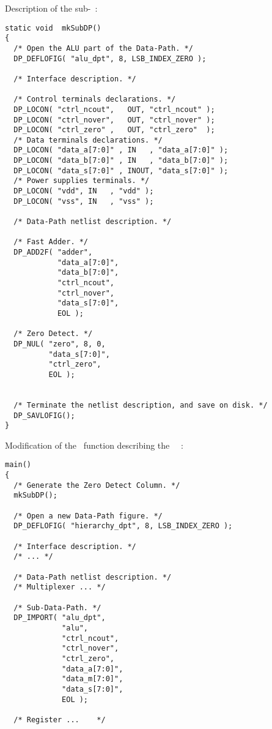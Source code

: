      \begin{description}
       \samepage
       \item
         Description of the sub-\datapath~:
         { \tt \begin{verbatim}
static void  mkSubDP()
{
  /* Open the ALU part of the Data-Path. */
  DP_DEFLOFIG( "alu_dpt", 8, LSB_INDEX_ZERO );

  /* Interface description. */

  /* Control terminals declarations. */
  DP_LOCON( "ctrl_ncout",   OUT, "ctrl_ncout" );
  DP_LOCON( "ctrl_nover",   OUT, "ctrl_nover" );
  DP_LOCON( "ctrl_zero" ,   OUT, "ctrl_zero"  );
  /* Data terminals declarations. */
  DP_LOCON( "data_a[7:0]" , IN   , "data_a[7:0]" );
  DP_LOCON( "data_b[7:0]" , IN   , "data_b[7:0]" );
  DP_LOCON( "data_s[7:0]" , INOUT, "data_s[7:0]" );
  /* Power supplies terminals. */
  DP_LOCON( "vdd", IN   , "vdd" );
  DP_LOCON( "vss", IN   , "vss" );

  /* Data-Path netlist description. */

  /* Fast Adder. */
  DP_ADD2F( "adder",
            "data_a[7:0]",
            "data_b[7:0]",
            "ctrl_ncout",
            "ctrl_nover",
            "data_s[7:0]",
            EOL );

  /* Zero Detect. */
  DP_NUL( "zero", 8, 0,
          "data_s[7:0]",
          "ctrl_zero",
          EOL );


  /* Terminate the netlist description, and save on disk. */
  DP_SAVLOFIG();
}
         \end{verbatim} \rm }
         \pagebreak[1]
       \item
         Modification of the \C\ function describing the \datapath\ \netlist~:
         { \tt \begin{verbatim}
main()
{
  /* Generate the Zero Detect Column. */
  mkSubDP();

  /* Open a new Data-Path figure. */
  DP_DEFLOFIG( "hierarchy_dpt", 8, LSB_INDEX_ZERO );

  /* Interface description. */
  /* ... */

  /* Data-Path netlist description. */ 
  /* Multiplexer ... */

  /* Sub-Data-Path. */
  DP_IMPORT( "alu_dpt",
             "alu",
             "ctrl_ncout",
             "ctrl_nover",
             "ctrl_zero",
             "data_a[7:0]",
             "data_m[7:0]",
             "data_s[7:0]",
             EOL );

  /* Register ...    */


\end{verbatim}}
\end{description}
